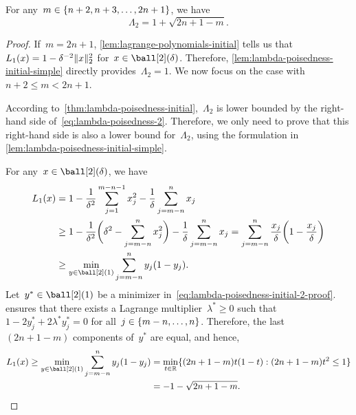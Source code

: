 \begin{proposition}
    For any~$m \in \{n + 2, n + 3, \dots, 2n + 1\}$, we have
    \begin{equation}
        \label{eq:lambda-poisedness-2}
        \Lambda_2 = 1 + \sqrt{2n + 1 - m}.
    \end{equation}
\end{proposition}

\begin{proof}
    If~$m = 2n + 1$, \cref{lem:lagrange-polynomials-initial} tells us that~$\lagp[1](x) = 1 - \delta^{-2} \norm{x}_2^2$ for~$x \in \ball[2](\delta)$.
    Therefore, \cref{lem:lambda-poisedness-initial-simple} directly provides~$\Lambda_2 = 1$.
    We now focus on the case with~$n + 2 \le m < 2n + 1$.

    According to~\cref{thm:lambda-poisedness-initial},~$\Lambda_2$ is lower bounded by the right-hand side of~\cref{eq:lambda-poisedness-2}.
    Therefore, we only need to prove that this right-hand side is also a lower bound for~$\Lambda_2$, using the formulation in \cref{lem:lambda-poisedness-initial-simple}.
    
    For any~$x \in \ball[2](\delta)$, we have
    \begin{subequations}
        \begin{align}
            \lagp[1](x) &= 1 - \frac{1}{\delta^2} \sum_{j = 1}^{m - n - 1} x_j^2 - \frac{1}{\delta} \sum_{j = m - n}^n x_j\\
                        &\ge 1 - \frac{1}{\delta^2} \bigg( \delta^2 - \sum_{j = m - n}^n x_j^2 \bigg) - \frac{1}{\delta} \sum_{j = m - n}^n x_j = \sum_{j = m - n}^n \frac{x_j}{\delta} \bigg( 1 - \frac{x_j}{\delta} \bigg)\\
                        &\ge \min_{y \in \ball[2](1)} \sum_{j = m - n}^n y_j (1 - y_j). \label{eq:lambda-poisedness-initial-2-proof}
        \end{align}
    \end{subequations}
    Let~$y^{\ast} \in \ball[2](1)$ be a minimizer in~\cref{eq:lambda-poisedness-initial-2-proof}.
     ensures that there exists a Lagrange multiplier~$\lambda^{\ast} \ge 0$ such that~$1 - 2 y_j^{\ast} + 2 \lambda^{\ast} y_j^{\ast} = 0$ for all~$j \in \{m - n, \dots, n\}$.
    Therefore, the last~$(2n + 1 - m)$ components of~$y^{\ast}$ are equal, and hence,
    \begin{align*}
        \lagp[1](x) \ge \min_{y \in \ball[2](1)} \sum_{j = m - n}^n y_j (1 - y_j)   &= \min_{t \in \R} \set{(2n + 1 - m) t (1 - t) : (2n + 1 - m) t^2 \le 1}\\
                                                                                    &= -1 - \sqrt{2n + 1 - m}.
    \end{align*}


\end{proof}
